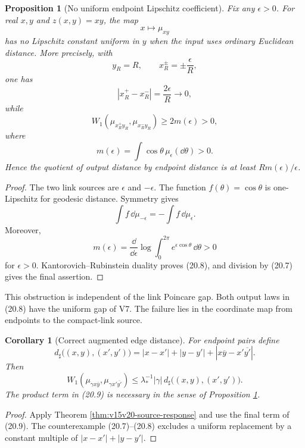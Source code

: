 \documentclass[11pt]{article}
\newtheorem{proposition}[theorem]{Proposition}
\newtheorem{corollary}[theorem]{Corollary}
\theoremstyle{remark}
\begin{document}
\begin{proposition}[No uniform endpoint Lipschitz coefficient]
\label{prop:v15v20-no-endpoint}
Fix any \(\epsilon>0\).  For real \(x,y\) and
\(z(x,y)=xy\), the map
\[
 x\longmapsto\mu_{xy}
\]
has no Lipschitz constant uniform in \(y\) when the input uses
ordinary Euclidean distance.  More precisely, with
\[
 y_R=R,\qquad x_R^\pm=\pm\frac{\epsilon}{R},
\]
one has
\[
 |x_R^+-x_R^-|=\frac{2\epsilon}{R}\longrightarrow0,         \tag{20.7}
\]
while
\[
 W_1(\mu_{x_R^+y_R},\mu_{x_R^-y_R})
 \ge2m(\epsilon)>0,                                        \tag{20.8}
\]
where
\[
 m(\epsilon)=\int\cos\theta\,\mu_\epsilon(\dd\theta)>0.
\]
Hence the quotient of output distance by endpoint distance is at
least \(Rm(\epsilon)/\epsilon\).
\end{proposition}

\begin{proof}
The two link sources are \(\epsilon\) and \(-\epsilon\).
The function \(f(\theta)=\cos\theta\) is one-Lipschitz for geodesic
distance.  Symmetry gives
\[
 \int f\,\dd\mu_{-\epsilon}
 =
 -\int f\,\dd\mu_\epsilon.
\]
Moreover,
\[
 m(\epsilon)
 =
 \frac{\dd}{\dd\epsilon}\log
 \int_0^{2\pi}e^{\epsilon\cos\theta}\,\dd\theta>0
\]
for \(\epsilon>0\).  Kantorovich--Rubinstein duality proves
(20.8), and division by (20.7) gives the final assertion.
\end{proof}

This obstruction is independent of the link Poincare gap.  Both
output laws in (20.8) have the uniform gap of V7.  The failure lies
in the coordinate map from endpoints to the compact-link source.

\begin{corollary}[Correct augmented edge distance]
\label{cor:v15v20-edge-metric}
For endpoint pairs define
\[
 d_\sharp\bigl((x,y),(x',y')\bigr)
 =
 |x-x'|+|y-y'|+
 |x\overline y-x'\overline{y'}|.                            \tag{20.9}
\]
Then
\[
 W_1(\mu_{\gamma x\overline y},
     \mu_{\gamma x'\overline{y'}})
 \le
 \lambda_*^{-1}|\gamma|\,
 d_\sharp\bigl((x,y),(x',y')\bigr).                         \tag{20.10}
\]
The product term in (20.9) is necessary in the sense of
Proposition \ref{prop:v15v20-no-endpoint}.
\end{corollary}

\begin{proof}
Apply Theorem \ref{thm:v15v20-source-response} and use the final
term of (20.9).  The counterexample (20.7)--(20.8) excludes a
uniform replacement by a constant multiple of
\(|x-x'|+|y-y'|\).
\end{proof}
\end{document}
